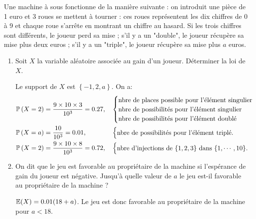 \documentclass[a4paper]{tp_um}
\begin{document}
\exo{} Une machine à sous fonctionne de la manière suivante : on introduit une pièce de 1 euro et 3 roues se mettent à tourner : ces roues représentent les dix chiffres de 0 à 9 et chaque roue s'arrête en montrant un chiffre au hasard. Si les trois chiffres sont différents, le joueur perd sa mise ; s'il y a un "double", le joueur récupère sa mise plus deux euros ; s'il y a un "triple", le joueur récupère sa mise plus $a$ euros.
\begin{enumerate}
\item Soit $X$ la variable aléatoire associée au gain d'un joueur. Déterminer la loi de $X$.	

\bigskip


	Le support de $X$ est $\left\{ -1, 2, a \right\}$. On a:
	\begin{align*}
		\P\left( X=2 \right) &= \frac{9 \times 10 \times 3}{10^3} = 0.27,  && \begin{cases}\text{nbre de places possible pour l'élément singulier}\\ \text{nbre de possibilités pour l'élément singulier}\\ \text{nbre de possibilités pour l'élément doublé}\end{cases} \\
		\P\left( X=a \right) &= \frac{10 }{10^3} = 0.01,  && \begin{cases}\text{nbre de possibilités pour l'élément triplé.}\end{cases}\\
		\P\left( X=2 \right) &= \frac{9 \times 10 \times 8}{10^3} = 0.72,  && \begin{cases}\text{nbre d'injections de $\left\{ 1,2,3\right\}$ dans $\left\{ 1,\cdots,10 \right\}$.}\end{cases}
	\end{align*}

\item On dit que le jeu est favorable au propriétaire de la machine si l'espérance de gain du joueur est négative. Jusqu'à quelle valeur de $a$ le jeu est-il favorable au propriétaire de la machine ?	

\bigskip


	$\E(X) = 0.01 (18 +a)$. Le jeu est donc favorable au propriétaire de la machine pour $a <18$.
\end{enumerate}

\end{document}
